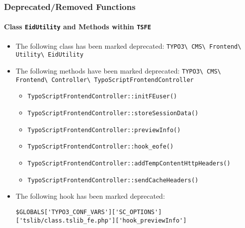 
\begin{frame}[fragile]
	\frametitle{Deprecated/Removed Functions}
	\framesubtitle{Class \texttt{EidUtility} and Methods within \texttt{TSFE}}

	\lstset{basicstyle=\tiny\ttfamily}

	\begin{itemize}
		\item The following class has been marked deprecated:\newline
			\smaller\texttt{TYPO3\textbackslash
				CMS\textbackslash
				Frontend\textbackslash
				Utility\textbackslash
				EidUtility}\normalsize

		\item The following methods have been marked deprecated:\newline
			\smaller\texttt{TYPO3\textbackslash
				CMS\textbackslash
				Frontend\textbackslash
				Controller\textbackslash
				TypoScriptFrontendController}\normalsize

				\begin{itemize}\smaller
					\item \texttt{TypoScriptFrontendController::initFEuser()}
					\item \texttt{TypoScriptFrontendController::storeSessionData()}
					\item \texttt{TypoScriptFrontendController::previewInfo()}
					\item \texttt{TypoScriptFrontendController::hook\_eofe()}
					\item \texttt{TypoScriptFrontendController::addTempContentHttpHeaders()}
					\item \texttt{TypoScriptFrontendController::sendCacheHeaders()}
				\end{itemize}

			\item The following hook has been marked deprecated:

				\begin{lstlisting}
$GLOBALS['TYPO3_CONF_VARS']['SC_OPTIONS']['tslib/class.tslib_fe.php']['hook_previewInfo']
				\end{lstlisting}

	\end{itemize}

\end{frame}

